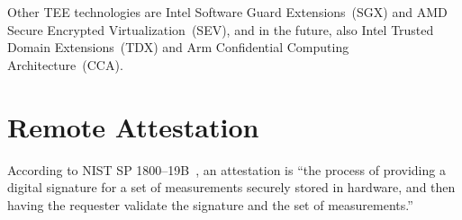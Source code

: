 Other \ac{TEE} technologies are Intel Software Guard Extensions~(SGX) and AMD Secure Encrypted Virtualization~(SEV), and in the future, also Intel Trusted Domain Extensions~(TDX) and Arm Confidential Computing Architecture~(CCA).










\section{Remote Attestation}


According to NIST SP 1800--19B~\cite{Bartock2022}, an attestation is ``the process of providing a digital signature for a set of measurements securely stored in hardware, and then having the requester validate the signature and the set of measurements.''




